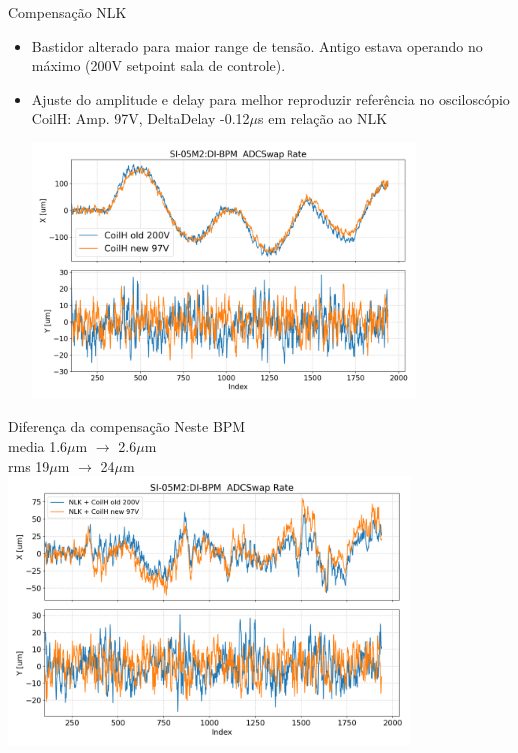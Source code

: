 \documentclass[1610]{beamer}					  %
\begin{document}
\begin{frame}{Compensação NLK}
\begin{itemize}
    \item Bastidor alterado para maior range de tensão. Antigo estava operando no máximo (200V setpoint sala de controle).
    \item Ajuste do amplitude e delay para melhor reproduzir referência no osciloscópio \\
    CoilH: Amp. 97V, DeltaDelay -0.12$\mu$s em relação ao NLK

    \centering
    \includegraphics[width=0.8\textwidth]{2024-04-19/figures/coilh_old_new.png}
\end{itemize}
\end{frame}

\begin{frame}{Diferença da compensação}
\centering
    Neste BPM \\
    media 1.6$\mu$m $\to$ 2.6$\mu$m\\
    rms 19$\mu$m $\to$ 24$\mu$m
    \includegraphics[width=0.8\textwidth]{2024-04-19/figures/nlk_and_coilh_old_new.png}
\end{frame}
\end{document}
